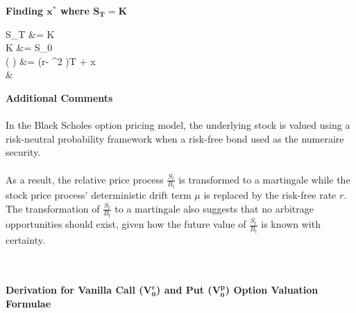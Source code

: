 \documentclass{article}
\begin{document}
\begin{minipage}[t]{0.5\textwidth}
	\begin{tcolorbox}[height=11.5cm,boxsep=5pt,arc=0pt,auto outer arc,colback=white,colframe=black]
		\noindent \textbf{Finding $\boldsymbol{x^*}$ where $\boldsymbol{S_T=K}$}
		\begin{flalign*}
		S_T &= K\\
		K &= S_0 \exp{}\\
		\log \left(  \right) &= \left(r- \sigma^2 \right)T + \sigma {} x\\
		&
		\end{flalign*}
		\noindent \textbf{Additional Comments}\\ \\
		In the Black Scholes option pricing model, the underlying stock is valued using a risk-neutral probability framework when a risk-free bond used as the numeraire security. \\ \\ As a result, the relative price process $\frac{S_t}{B_t}$ is transformed to a martingale while the stock price process' deterministic drift term $\mu$ is replaced by the risk-free rate $r$. The transformation of $\frac{S_t}{B_t}$ to a martingale also suggests that no arbitrage opportunities should exist, given how the future value of $\frac{S_t}{B_t}$ is known with certainty.
	\end{tcolorbox}
\end{minipage} \\ \\
\noindent \textbf{Derivation for Vanilla Call ($\boldsymbol{V_0^c}$) and Put ($\boldsymbol{V_0^p}$) Option Valuation Formulae}
\end{document}
